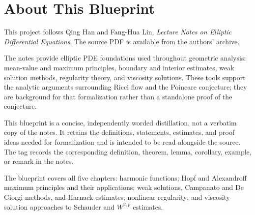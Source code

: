 

\chapter*{About This Blueprint}

This project follows Qing Han and Fang-Hua Lin, \emph{Lecture Notes on
Elliptic Differential Equations}. The source PDF is available from the
\href{http://home.ustc.edu.cn/\%7Eanprin/EllipticEq-Han-Lin.pdf}{authors' archive}.

The notes provide elliptic PDE foundations used throughout geometric analysis:
mean-value and maximum principles, boundary and interior estimates, weak
solution methods, regularity theory, and viscosity solutions. These tools
support the analytic arguments surrounding Ricci flow and the Poincare
conjecture; they are background for that formalization rather than a standalone
proof of the conjecture.

This blueprint is a concise, independently worded distillation, not a verbatim
copy of the notes. It retains the definitions, statements, estimates, and proof
ideas needed for formalization and is intended to be read alongside the source.
The \texttt{\dcref} tag records the corresponding definition, theorem,
lemma, corollary, example, or remark in the notes.

The blueprint covers all five chapters: harmonic functions; Hopf and
Alexandroff maximum principles and their applications; weak solutions,
Campanato and De Giorgi methods, and Harnack estimates; nonlinear regularity;
and viscosity-solution approaches to Schauder and $W^{2,p}$ estimates.






